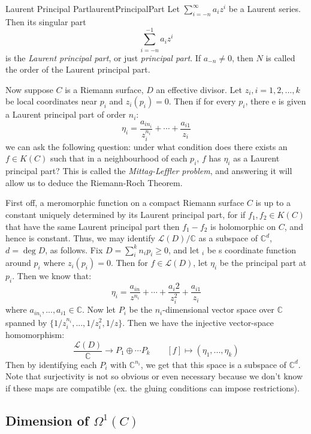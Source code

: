\documentclass{book}
\newcommand{\C}{{\mathbb{C}}}
\newcommand{\CL}{{\mathcal{L}}}
\begin{document}
\begin{defn}{Laurent Principal Part}{laurentPrincipalPart}
  Let $\sum_{i=-n}^\infty a_iz^i$ be a Laurent series. Then its singular part
  \[
    \sum_{i=-n}^{-1} a_iz^i
  \]
  is the \emph{Laurent principal part}, or just \emph{principal part}. If $a_{-n} \ne 0$, then $N$ is called
  the order of the Laurent principal part.
\end{defn}

Now suppose $C$ is a Riemann surface, $D$ an effective divisor. Let $z_i, i = 1,2,..., k$ be local coordinates
near $p_i$ and $z_i(p_i) = 0$. Then if for every $p_i$, there e is given a Laurent principal part of order
$n_i$:
\[
  \eta_i = \frac{a_{in_i}}{z_i^{n_i}} + \cdots + \frac{a_{i1}}{z_i}
\]
we can ask the following question: under what condition does there exists an $f \in K(C)$  such that in a
neighbourhood of each $p_i$, $f$ has $\eta_i$ as a Laurent principal part? This is called the
\emph{Mittag-Leffler problem}, and answering it will allow us to deduce the Riemann-Roch Theorem.

First off, a meromorphic function on a compact Riemann surface $C$ is up to a constant uniquely determined by
its Laurent principal part, for if $f_1, f_2 \in K(C)$ that have the same Laurent principal part then $f_1
- f_2$ is holomorphic on $C$, and hence is constant. Thus, we may identify $\CL(D)/\C$ as a subspace of
$\C^d$, $d =\deg D$, as follows. Fix $D = \sum_i^k n_ip_i \ge 0$, and let $_i$ be s coordinate function
around $p_i$ where $z_i(p_i) = 0$. Then for $ f\in \CL(D)$, let $\eta_i$ be the principal part at $p_i$. Then
we know that:
\[
  \eta_i  = \frac{a_{in}}{z^{n_i}} + \cdots + \frac{a_i2}{z_i^2} + \frac{a_{i1}}{z_i}
\]
where $a_{in_i}, ..., a_{i1} \in \C$. Now let $P_i$ be the $n_i$-dimensional vector space over $\C$ spanned by
$\{1/z_i^{n_i}, ..., 1/z_i^2, 1/z\}$. Then we have the injective vector-space homomorphism:
\[
  \frac{\CL(D)}{\C} \to P_1\oplus \cdots P_k \qquad [f] \mapsto (\eta_1, ..., \eta_k)
\]
Then by identifying each $P_i$ with $\C^{n_i}$, we get that this space is a subspace of  $\C^d$. Note that
surjectivity is not so obvious or even necessary because we don't know if these maps are compatible (ex. the
gluing conditions can impose restrictions).


\subsection{Dimension of $\Omega^1(C)$}\label{sec:dimOfDiffFormsOfDiv}
\end{document}
